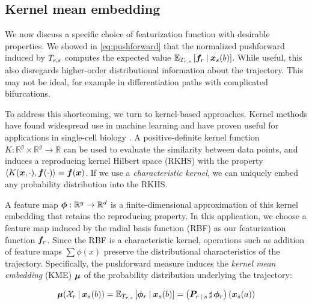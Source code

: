 \subsection{Kernel mean embedding}

We now discuss a specific choice of featurization function with desirable properties. We showed in \eqref{eq:pushforward} that the normalized pushforward induced by $T_{r, s}$ computes the expected value $\mathbb{E}_{T_{r, s}}\left[\bm{f}_{r} \:\vert\: \bm{x}_{s}(b)\right]$. While useful, this also disregards higher-order distributional information about the trajectory. This may not be ideal, for example in differentiation paths with complicated bifurcations.

To address this shortcoming, we turn to kernel-based approaches. Kernel methods have found widespread use in machine learning and have proven useful for applications in single-cell biology \citep{baskaranDistributionbasedSketchingSinglecell2022a}. A positive-definite kernel function $K: \mathbb{R}^g \times \mathbb{R}^g \rightarrow \mathbb{R}$ can be used to evaluate the similarity between data points, and induces a reproducing kernel Hilbert space (RKHS) with the property $\langle K(\bm{x}, \cdot), \bm{f}(\cdot)\rangle = \bm{f}(\bm{x})$. If we use a \textit{characteristic kernel}, we can uniquely embed any probability distribution into the RKHS.

A feature map $\bm{\phi}: \mathbb{R}^g \rightarrow \mathbb{R}^d$ is a finite-dimensional approximation of this kernel embedding that retains the reproducing property. In this application, we choose a feature map induced by the radial basis function (RBF) as our featurization function $\bm{f}_{r}$. Since the RBF is a characteristic kernel, operations such as addition of feature maps $\sum \phi(x)$ preserve the distributional characteristics of the trajectory. Specifically, the pushforward measure induces the \textit{kernel mean embedding} (KME) $\bm{\mu}$ of the probability distribution underlying the trajectory:

\begin{equation} \label{eq:kme}
    \bm{\mu}(\mathcal{X}_{r}  \:\vert\:  \bm{x}_{s}(b)) = \mathbb{E}_{T_{r, s}}\left[\bm{\phi}_{r} \:\vert\: \bm{x}_{s}(b)\right] = \left(\bm{P}_{r\:\vert\: s} \,\sharp\, \bm{\phi}_{r}\right) \left(\bm{x}_{s}(a)\right)
\end{equation}

